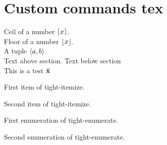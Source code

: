 \documentclass{article}
\begin{document}
\section{Custom commands tex}
Ceil of a number $\lceil x\rceil$. \\
Floor of a number $\lfloor x\rfloor$. \\
A tuple $\langle a,b\rangle$. \\

Text above section.
Text below section \\
This is a test $\mathbf{\bar{x}}$

\begin{tight_itemize}
  \item First item of tight-itemize.
  \item Second item of tight-itemize.
\end{tight_itemize}

\begin{tight_enumerate}
  \item First enumeration of tight-enumerate.
  \item Second enumeration of tight-enumerate.
\end{tight_enumerate}
\end{document}

